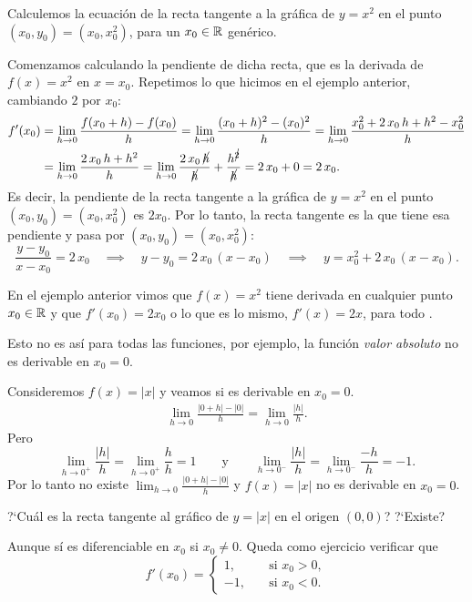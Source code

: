 \begin{example}
    Calculemos la ecuación de la recta tangente a la gráfica de $y=x^2$ en el punto $(x_0,y_0)=(x_0,x_0^2)$, para un $x_0\in\mathbb{R}$ genérico.

    Comenzamos calculando la pendiente de dicha recta, que es la derivada de $f(x)=x^2$ en $x=x_0$. Repetimos lo que hicimos en el ejemplo anterior, cambiando $2$ por $x_0$:
        \begin{align*}
    f'(x_0) 
    &= \lim_{h\to 0}\frac{f(x_0+h)-f(x_0)}{h}
    = \lim_{h\to 0}\frac{(x_0+h)^2-(x_0)^2}{h}
    = \lim_{h\to 0}\frac{x_0^2+2\, x_0\, h+h^2-x_0^2}{h}
    \\
    &= \lim_{h\to 0}\frac{2\, x_0 \, h+h^2}{h}
    = \lim_{h\to 0}\frac{2\, x_0\, \cancel{h}}{\cancel{h}}+\frac{h^{\cancel{2}}}{\cancel{h}}
    = 2\,x_0+0=2\,x_0.
    \end{align*}
    Es decir, la pendiente de la recta tangente a la gráfica de $y=x^2$ en el punto $(x_0,y_0)=(x_0,x_0^2)$ es $2 x_0$. 
    Por lo tanto, la recta tangente es la que tiene esa pendiente y  pasa por $(x_0,y_0)=(x_0,x_0^2)$:
    \[
    \frac{y-y_0}{x-x_0} = 2\, x_0
    \quad\implies\quad
    y - y_0 = 2 \, x_0\, (x-x_0)
    \quad\implies\quad
    y = x_0^2+2 \, x_0\, (x-x_0).
    \]
\end{example}

En el ejemplo anterior vimos que $f(x)=x^2$ tiene derivada en cualquier punto $x_0\in\mathbb{R}$ y que $f'(x_0)=2x_0$ o lo que es lo mismo, $f'(x)=2x$, para todo \xiR.



Esto no es así para todas las funciones, por ejemplo, la función \emph{valor absoluto} no es derivable en $x_0=0$.

\begin{example}
    Consideremos $f(x)=|x|$ y veamos si es derivable en $x_0=0$.
    \begin{align*}
        \lim_{h\to 0} \frac{|0+h|-|0|}h
        =
        \lim_{h\to 0} \frac{|h|}h.
    \end{align*}
    Pero 
    \[
        \lim_{h\to 0^+} \frac{|h|}h
        = \lim_{h\to 0^+} \frac{h}h = 1
        \qquad\text{y}\qquad
        \lim_{h\to 0^-} \frac{|h|}h
        = \lim_{h\to 0^-} \frac{-h}h = -1.
    \]
    Por lo tanto no existe $\lim_{h\to 0} \frac{|0+h|-|0|}h$ y $f(x)=|x|$ no es derivable en $x_0=0$.

    ?`Cuál es la recta tangente al gráfico de $y=|x|$ en el origen $(0,0)$? ?`Existe?

    Aunque sí es diferenciable en $x_0$ si $x_0\neq 0$.
    Queda como ejercicio verificar que
    \[
    f'(x_0) = \begin{cases}
        1,\quad&\text{si $x_0>0$},\\
        -1,\quad&\text{si $x_0<0$}.
        \end{cases}
    \]
\end{example}


